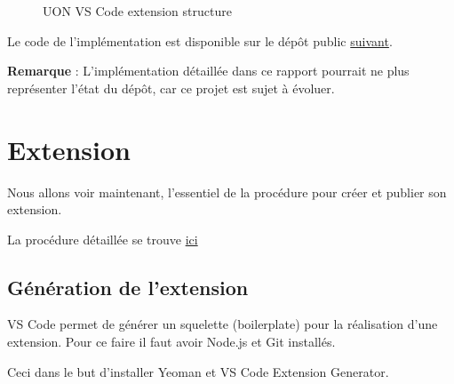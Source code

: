 \documentclass[
    iict, %
    il, %
]{heig-tb}
\begin{document}
\begin{figure}[!h]
    \centering
    \caption{UON VS Code extension structure}
\end{figure}

Le code de l'implémentation est disponible sur le dépôt public \href{https://github.com/vitorva/vscode-uon}{suivant}.

\textbf{Remarque} : L'implémentation détaillée dans ce rapport pourrait ne plus représenter l'état du dépôt, car ce projet est sujet à évoluer.

\section{Extension}
Nous allons voir maintenant, l'essentiel de la procédure pour créer et publier son extension.

La procédure détaillée se trouve \href{https://code.visualstudio.com/api/get-started/your-first-extension
}{ici}

\subsection{Génération de l'extension}

VS Code permet de générer un squelette (boilerplate) pour la réalisation d'une extension.
Pour ce faire il faut avoir Node.js et Git installés.

Ceci dans le but d'installer Yeoman et VS Code Extension Generator.
\end{document}
